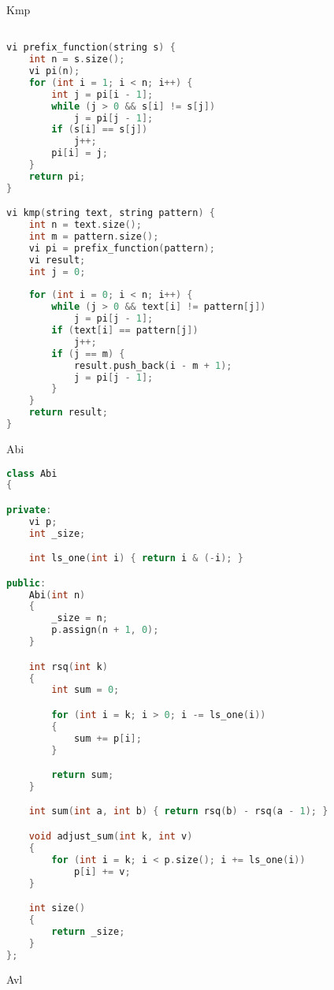 \documentclass[leter]{amsart}
\begin{document}
Kmp
\begin{multicols}{2}
\begin{lstlisting}[language=C++]

vi prefix_function(string s) {
    int n = s.size();
    vi pi(n);
    for (int i = 1; i < n; i++) {
        int j = pi[i - 1];
        while (j > 0 && s[i] != s[j])
            j = pi[j - 1];
        if (s[i] == s[j])
            j++;
        pi[i] = j;
    }
    return pi;
}

vi kmp(string text, string pattern) {
    int n = text.size();
    int m = pattern.size();
    vi pi = prefix_function(pattern);
    vi result;
    int j = 0;
    
    for (int i = 0; i < n; i++) {
        while (j > 0 && text[i] != pattern[j])
            j = pi[j - 1];
        if (text[i] == pattern[j])
            j++;
        if (j == m) {
            result.push_back(i - m + 1);
            j = pi[j - 1];
        }
    }
    return result;
}


\end{lstlisting}
\end{multicols}
Abi
\begin{multicols}{2}
\begin{lstlisting}[language=C++]
class Abi
{

private:
    vi p;
    int _size;

    int ls_one(int i) { return i & (-i); }

public:
    Abi(int n)
    {
        _size = n;
        p.assign(n + 1, 0);
    }

    int rsq(int k)
    {
        int sum = 0;

        for (int i = k; i > 0; i -= ls_one(i))
        {
            sum += p[i];
        }

        return sum;
    }

    int sum(int a, int b) { return rsq(b) - rsq(a - 1); }

    void adjust_sum(int k, int v)
    {
        for (int i = k; i < p.size(); i += ls_one(i))
            p[i] += v;
    }

    int size()
    {
        return _size;
    }
};

\end{lstlisting}
\end{multicols}
Avl
\end{document}
